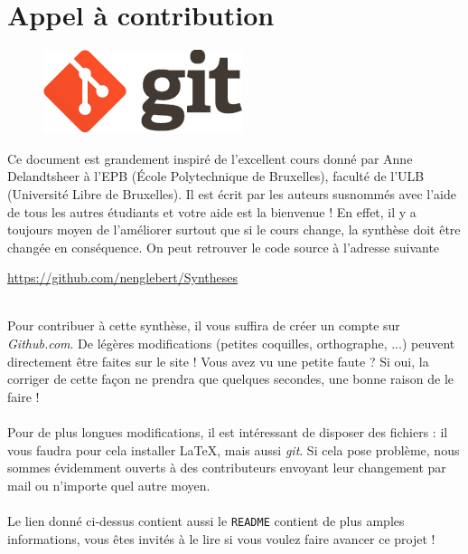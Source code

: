 \chapter*{Appel à contribution}
\begin{figure}
	\includegraphics[scale=0.5]{git.png}
\end{figure}
Ce document est grandement inspiré de l’excellent cours donné 
par Anne Delandtsheer à l’EPB (École Polytechnique de Bruxelles), faculté de l’ULB (Université 
Libre de Bruxelles). Il est écrit par les auteurs susnommés avec l’aide de tous les autres étudiants 
et votre aide est la bienvenue ! En effet, il y a toujours moyen de l’améliorer surtout que si le 
cours change, la synthèse doit être changée en conséquence. On peut retrouver le code source à l’adresse 
suivante
\begin{center}
	\url{https://github.com/nenglebert/Syntheses}
\end{center}\ \\
Pour contribuer à cette synthèse, il vous suffira de créer un compte sur \textit{Github.com}. De
légères modifications (petites coquilles, orthographe, ...) peuvent directement être faites sur le
site ! Vous avez vu une petite faute ? Si oui, la corriger de cette façon ne prendra que quelques 
secondes, une bonne raison de le faire ! \\
\\
Pour de plus longues modifications, il est intéressant de disposer des fichiers : il vous 
faudra pour cela installer \LaTeX, mais aussi \textit{git}. Si cela pose problème, nous sommes 
évidemment ouverts à des contributeurs envoyant leur changement par mail ou n’importe quel autre 
moyen.\\
\\
Le lien donné ci-dessus contient aussi le \texttt{README} contient de plus amples informations, 
vous êtes invités à le lire si vous voulez faire avancer ce projet ! 

